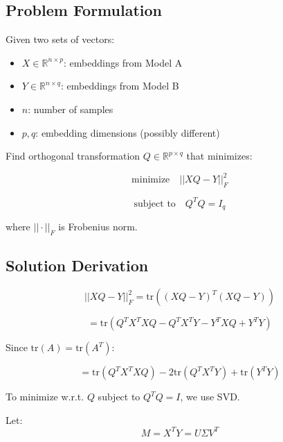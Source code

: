 \documentclass[12pt,a4paper,oneside]{report}
\begin{document}
\subsection{Problem Formulation}

Given two sets of vectors:
\begin{itemize}
    \item $X \in \mathbb{R}^{n \times p}$: embeddings from Model A
    \item $Y \in \mathbb{R}^{n \times q}$: embeddings from Model B
    \item $n$: number of samples
    \item $p, q$: embedding dimensions (possibly different)
\end{itemize}

Find orthogonal transformation $Q \in \mathbb{R}^{p \times q}$ that minimizes:

\begin{equation}
\text{minimize} \quad ||XQ - Y||_F^2
\end{equation}

\begin{equation}
\text{subject to} \quad Q^T Q = I_q
\end{equation}

where $||\cdot||_F$ is Frobenius norm.

\subsection{Solution Derivation}

\begin{equation}
||XQ - Y||_F^2 = \text{tr}((XQ-Y)^T(XQ-Y))
\end{equation}

\begin{equation}
= \text{tr}(Q^T X^T X Q - Q^T X^T Y - Y^T X Q + Y^T Y)
\end{equation}

Since $\text{tr}(A) = \text{tr}(A^T)$:

\begin{equation}
= \text{tr}(Q^T X^T X Q) - 2\text{tr}(Q^T X^T Y) + \text{tr}(Y^T Y)
\end{equation}

To minimize w.r.t. $Q$ subject to $Q^T Q = I$, we use SVD.

Let:
\begin{equation}
M = X^T Y = U \Sigma V^T
\end{equation}
\end{document}
